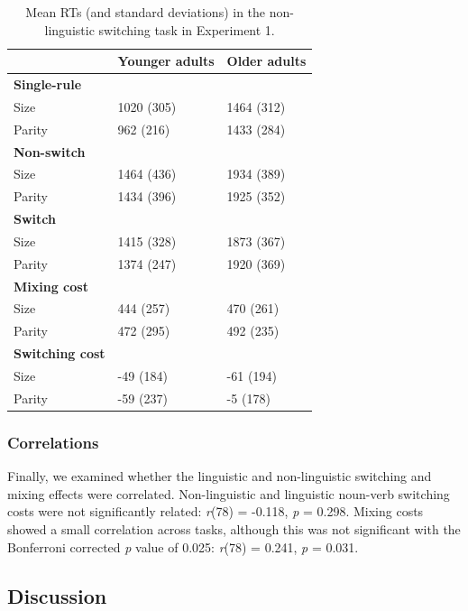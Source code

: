 \documentclass[
]{article}
\begin{document}
\begin{table}

\caption{\label{tab:Table3}Mean RTs (and standard deviations) in the non-linguistic switching task in Experiment 1.}
\centering
\begin{tabular}[t]{lll}
\toprule
\textbf{} & \textbf{Younger adults} & \textbf{Older adults}\\
\midrule
\textbf{Single-rule} & \textbf{} & \textbf{}\\
Size & 1020 (305) & 1464 (312)\\
Parity & 962 (216) & 1433 (284)\\
\textbf{Non-switch} & \textbf{} & \textbf{}\\
Size & 1464 (436) & 1934 (389)\\
\addlinespace
Parity & 1434 (396) & 1925 (352)\\
\textbf{Switch} & \textbf{} & \textbf{}\\
Size & 1415 (328) & 1873 (367)\\
Parity & 1374 (247) & 1920 (369)\\
\textbf{Mixing cost} & \textbf{} & \textbf{}\\
\addlinespace
Size & 444 (257) & 470 (261)\\
Parity & 472 (295) & 492 (235)\\
\textbf{Switching cost} & \textbf{} & \textbf{}\\
Size & -49 (184) & -61 (194)\\
Parity & -59 (237) & -5 (178)\\
\bottomrule
\end{tabular}
\end{table}

\hypertarget{correlations}{%
\subsubsection{Correlations}\label{correlations}}

Finally, we examined whether the linguistic and non-linguistic switching and mixing effects were correlated. Non-linguistic and linguistic noun-verb switching costs were not significantly related: \emph{r}(78) = -0.118, \emph{p} = 0.298. Mixing costs showed a small correlation across tasks, although this was not significant with the Bonferroni corrected \emph{p} value of 0.025: \emph{r}(78) = 0.241, \emph{p} = 0.031.

\hypertarget{discussion}{%
\subsection{Discussion}\label{discussion}}
\end{document}
